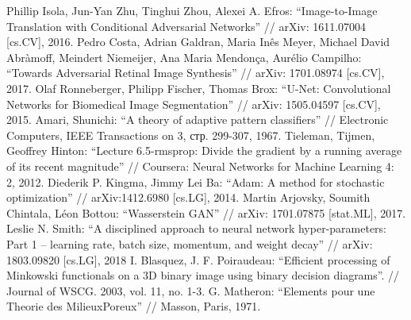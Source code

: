 \documentclass[a4paper]{article}
\begin{document}
\begin{thebibliography}{99}
		 Phillip Isola, Jun-Yan Zhu, Tinghui Zhou, Alexei A. Efros: ``Image-to-Image Translation with Conditional Adversarial Networks'' // arXiv: 1611.07004 [cs.CV], 2016.
		 Pedro Costa, Adrian Galdran, Maria Inês Meyer, Michael David Abràmoff, Meindert Niemeijer, Ana Maria Mendonça, Aurélio Campilho: ``Towards Adversarial Retinal Image Synthesis'' // arXiv: 1701.08974 [cs.CV], 2017.
		 Olaf Ronneberger, Philipp Fischer, Thomas Brox: ``U-Net: Convolutional Networks for Biomedical Image Segmentation'' // arXiv: 1505.04597 [cs.CV], 2015.
		 Amari, Shunichi: ``A theory of adaptive pattern classifiers'' // Electronic Computers, IEEE Transactions on 3, стр. 299-307, 1967.
		 Tieleman, Tijmen, Geoffrey Hinton: ``Lecture 6.5-rmsprop: Divide the gradient by a running average of its recent magnitude'' // Coursera: Neural Networks for Machine Learning 4: 2, 2012.
		 Diederik P. Kingma, Jimmy Lei Ba: ``Adam: A method for stochastic optimization'' // arXiv:1412.6980 [cs.LG], 2014.
		 Martin Arjovsky, Soumith Chintala, Léon Bottou: ``Wasserstein GAN'' // arXiv: 1701.07875 [stat.ML], 2017.
		 Leslie N. Smith: ``A disciplined approach to neural network hyper-parameters: Part 1 -- learning rate, batch size, momentum, and weight decay'' // arXiv: 1803.09820 [cs.LG], 2018
		 I. Blasquez, J. F. Poiraudeau: ``Efficient processing of Minkowski functionals on a 3D binary image using binary decision diagrams''. // Journal of WSCG. 2003, vol. 11, no. 1-3.
		 G. Matheron: ``Elements  pour  une  Theorie  des  MilieuxPoreux'' // Masson, Paris, 1971.
	\end{thebibliography}
	
\end{document}
